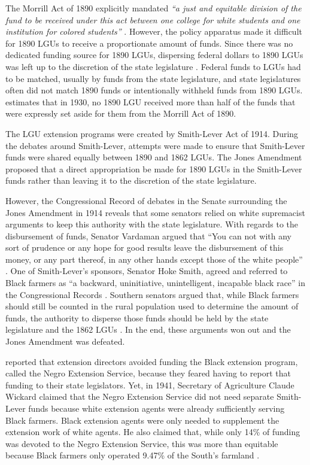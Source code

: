 \documentclass[12pt]{article}
\begin{document}
The Morrill Act of 1890 explicitly mandated\textit{ “a just and equitable division of the fund to be received under this act between one college for white students and one institution for colored students”} \citep[pg. 314]{davis_negro_1933}.
However, the policy apparatus made it difficult for 1890 LGUs to receive a proportionate amount of funds.
Since there was no dedicated funding source for 1890 LGUs, dispersing federal dollars to 1890 LGUs was left up to the discretion of the state legislature \citep{davis_negro_1933,harris_extension_2008}. 
Federal funds to LGUs had to be matched, usually by funds from the state legislature, and state legislatures often did not match 1890 funds or intentionally withheld funds from 1890 LGUs. 
\citet{davis_negro_1933} estimates that in 1930, no 1890 LGU received more than half of the funds that were expressly set aside for them from the Morrill Act of 1890. 

The LGU extension programs were created by Smith-Lever Act of 1914.
During the debates around Smith-Lever, attempts were made to ensure that Smith-Lever funds were shared equally between 1890 and 1862 LGUs. 
The Jones Amendment proposed that a direct appropriation be made for 1890 LGUs in the Smith-Lever funds rather than leaving it to the discretion of the state legislature. 

However, the Congressional Record of debates in the Senate surrounding the Jones Amendment in 1914 reveals that some senators relied on white supremacist arguments to keep this authority with the state legislature.
With regards to the disbursement of funds, Senator Vardaman argued that “You can not with any sort of prudence or any hope for good results leave the disbursement of this money, or any part thereof, in any other hands except those of the white people” \citep{51_cong_rec_2651-2_congressional_1914}.
One of Smith-Lever’s sponsors, Senator Hoke Smith, agreed and referred to Black farmers as “a backward, uninitiative, unintelligent, incapable black race” in the Congressional Records \citep{51_cong_rec_2651-2_congressional_1914}. 
Southern senators argued that, while Black farmers should still be counted in the rural population used to determine the amount of funds, the authority to disperse those funds should be held by the state legislature and the 1862 LGUs \citep{harris_extension_2008}. 
In the end, these arguments won out and the Jones Amendment was defeated.

\citet{baker_negro_1939} reported that extension directors avoided funding the Black extension program, called the Negro Extension Service, because they feared having to report that funding to their state legislators. 
Yet, in 1941, Secretary of Agriculture Claude Wickard claimed that the Negro Extension Service did not need separate Smith-Lever funds because white extension agents were already sufficiently serving Black farmers.
Black extension agents were only needed to supplement the extension work of white agents. 
He also claimed that, while only 14\% of funding was devoted to the Negro Extension Service, this was more than equitable because Black farmers only operated 9.47\% of the South’s farmland \citep{wickard_extension_1941}.
\end{document}
